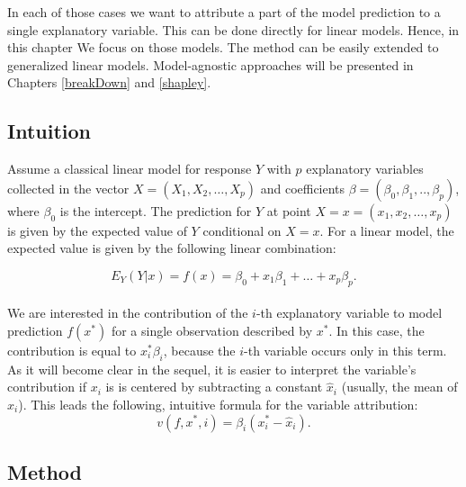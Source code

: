 \documentclass[12pt,]{krantz}
\theoremstyle{definition}
\theoremstyle{definition}
\theoremstyle{definition}
\theoremstyle{remark}
\begin{document}
In each of those cases we want to attribute a part of the model
prediction to a single explanatory variable. This can be done directly
for linear models. Hence, in this chapter We focus on those models. The
method can be easily extended to generalized linear models.
Model-agnostic approaches will be presented in Chapters \ref{breakDown}
and \ref{shapley}.

\hypertarget{intuition-4}{%
\subsection{Intuition}\label{intuition-4}}

Assume a classical linear model for response \(Y\) with \(p\)
explanatory variables collected in the vector
\(X = (X_1, X_2, \ldots, X_p)\) and coefficients
\(\beta = (\beta_0, \beta_1, .., \beta_p)\), where \(\beta_0\) is the
intercept. The prediction for \(Y\) at point
\(X=x=(x_1, x_2, \ldots, x_p)\) is given by the expected value of \(Y\)
conditional on \(X=x\). For a linear model, the expected value is given
by the following linear combination:

\[
E_Y(Y | x) = f(x) = \beta_0 + x_1 \beta_1 + \ldots + x_p \beta_p.
\]\\
We are interested in the contribution of the \(i\)-th explanatory
variable to model prediction \(f(x^*)\) for a single observation
described by \(x^*\). In this case, the contribution is equal to
\(x^*_i\beta_i\), because the \(i\)-th variable occurs only in this
term. As it will become clear in the sequel, it is easier to interpret
the variable's contribution if \(x_i\) is is centered by subtracting a
constant \(\hat x_i\) (usually, the mean of \(x_i\)). This leads the
following, intuitive formula for the variable attribution: \[
v(f, x^*, i) = \beta_i (x_i^* - \hat x_i).
\]

\hypertarget{method-4}{%
\subsection{Method}\label{method-4}}
\end{document}

